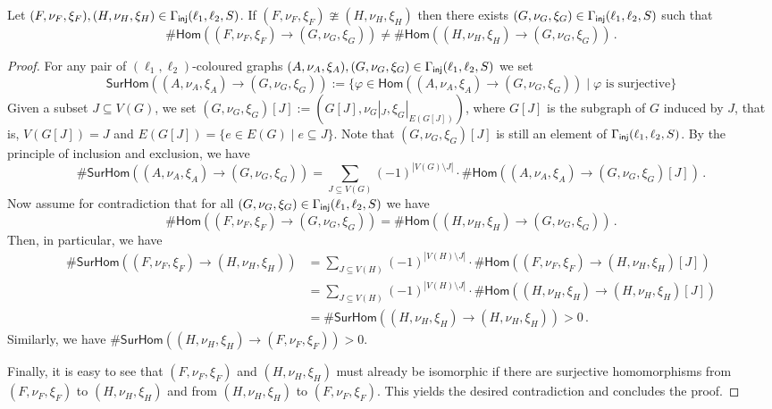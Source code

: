 \documentclass[authorcolumns,numberwithinsect]{no-lipics-v2022}
\newcommand{\homs}[2]{\mathsf{Hom}(#1 \to #2)}
\newcommand{\surhoms}[2]{\mathsf{SurHom}(#1 \to #2)}
\begin{document}
\begin{proposition}\label{prop:distinct}
    Let $(F,\nu_F,\xi_F),(H,\nu_H,\xi_H) \in \Gamma_{\text{\sf{inj}}}(\ell_1,\ell_2,S)$. If $(F,\nu_F,\xi_F)\ncong (H,\nu_H,\xi_H)$ then there exists $(G,\nu_G,\xi_G)\in \Gamma_{\text{\sf{inj}}}(\ell_1,\ell_2,S)$ such that
    \[ \#\homs{(F,\nu_F,\xi_F)}{(G,\nu_G,\xi_G)} \neq \#\homs{(H,\nu_H,\xi_H)}{(G,\nu_G,\xi_G)} \,.\]
\end{proposition}
\begin{proof}
    For any pair of $(\ell_1,\ell_2)$-coloured graphs $(A,\nu_A,\xi_A),(G,\nu_G,\xi_G) \in \Gamma_{\text{\sf{inj}}}(\ell_1,\ell_2,S)$ we set
    \[ \surhoms{(A,\nu_A,\xi_A)}{(G,\nu_G,\xi_G)} := \{ \varphi \in \homs{(A,\nu_A,\xi_A)}{(G,\nu_G,\xi_G)} \mid \varphi \text{ is surjective} \} \]
    Given a subset $J \subseteq V(G)$, we set $(G,\nu_G,\xi_G)[J] := (G[J],\nu_G|_{J},\xi_G|_{E(G[J])})$,
    where $G[J]$ is the subgraph of $G$ induced by $J$, that is, $V(G[J])=J$ and $E(G[J])=\{e \in E(G) \mid e \subseteq J\}$. Note that $(G,\nu_G,\xi_G)[J]$ is still an element of $\Gamma_{\text{\sf{inj}}}(\ell_1,\ell_2,S)$.
    By the principle of inclusion and exclusion, we have
    \[\#\surhoms{(A,\nu_A,\xi_A)}{(G,\nu_G,\xi_G)} = \sum_{J \subseteq V(G)} (-1)^{|V(G)\setminus J|} \cdot \#\homs{(A,\nu_A,\xi_A)}{(G,\nu_G,\xi_G)[J]} \,.\]
    Now assume for contradiction that for all $(G,\nu_G,\xi_G) \in \Gamma_{\text{\sf{inj}}}(\ell_1,\ell_2,S)$ we have
    \[ \#\homs{(F,\nu_F,\xi_F)}{(G,\nu_G,\xi_G)} = \#\homs{(H,\nu_H,\xi_H)}{(G,\nu_G,\xi_G)} \,.\]
    Then, in particular, we have
    \begin{align*}
        \#\surhoms{(F,\nu_F,\xi_F)}{(H,\nu_H,\xi_H)} &= \sum_{J \subseteq V(H)} (-1)^{|V(H)\setminus J|} \cdot \#\homs{(F,\nu_F,\xi_F)}{(H,\nu_H,\xi_H)[J]}\\
        ~& = \sum_{J \subseteq V(H)} (-1)^{|V(H)\setminus J|} \cdot \#\homs{(H,\nu_H,\xi_H)}{(H,\nu_H,\xi_H)[J]}\\
        ~&= \#\surhoms{(H,\nu_H,\xi_H)}{(H,\nu_H,\xi_H)} > 0\,.
    \end{align*}
    Similarly, we have $\#\surhoms{(H,\nu_H,\xi_H)}{(F,\nu_F,\xi_F)}>0$. 

    Finally, it is easy to see that $(F,\nu_F,\xi_F)$ and $(H,\nu_H,\xi_H)$ must already be isomorphic if there are surjective homomorphisms from $(F,\nu_F,\xi_F)$ to $(H,\nu_H,\xi_H)$ and from $(H,\nu_H,\xi_H)$ to $(F,\nu_F,\xi_F)$. This yields the desired contradiction and concludes the proof. 
\end{proof}
\end{document}
